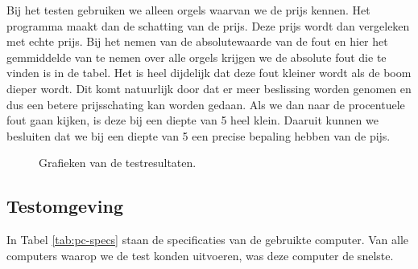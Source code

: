 Bij het testen gebruiken we alleen orgels waarvan we de prijs kennen. Het programma maakt dan de schatting van de prijs. Deze prijs wordt dan vergeleken met echte prijs. Bij het nemen van de absolutewaarde van de fout en hier het gemmiddelde van te nemen over alle orgels krijgen we de absolute fout die te vinden is in de tabel. Het is heel dijdelijk dat deze fout kleiner wordt als de boom dieper wordt. Dit komt natuurlijk door dat er meer beslissing worden genomen en dus een betere prijsschating kan worden gedaan. Als we dan naar de procentuele fout gaan kijken, is deze bij een diepte van 5 heel klein. Daaruit kunnen we besluiten dat we bij een diepte van 5 een precise bepaling hebben van de pijs.

\begin{figure}[ht]
    \centering


    \caption{Grafieken van de testresultaten.}
    \label{fig:test_result}
\end{figure}

\subsection{Testomgeving}
In Tabel \ref{tab:pc-specs} staan de specificaties van de gebruikte computer. Van alle computers waarop we de test konden uitvoeren, was deze computer de snelste.

